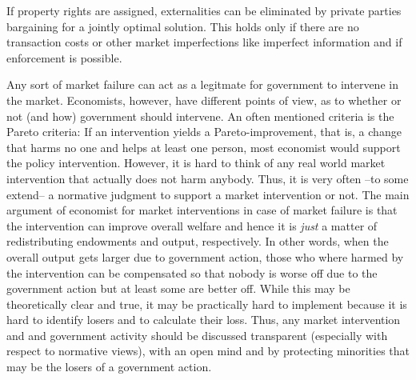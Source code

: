 {{		\item If property rights are assigned, externalities can be eliminated by private parties bargaining for a jointly optimal solution. This holds only if there are no transaction costs or other market imperfections like imperfect information and if enforcement is possible.
		
		\item Any sort of market failure can act as a legitmate for government to intervene in the market. Economists, however, have different points of view, as to whether or not (and how) government should intervene. An often mentioned criteria is the Pareto criteria: If an intervention yields a Pareto-improvement, that is, a change that harms no one and helps at least one person, most economist would support the policy intervention. However, it is hard to think of any real world market intervention that actually does not harm anybody. Thus, it is very often --to some extend-- a normative judgment to support a market intervention or not. The main argument of economist for market interventions in case of market failure is that the intervention can improve overall welfare and hence it is \textit{just} a matter of redistributing endowments and output, respectively. In other words, when the overall output gets larger due to government action, those who where harmed by the intervention can be compensated so that nobody is worse off due to the government action but at least some are better off. While this may be theoretically clear and true, it may be practically hard to implement because it is hard to identify losers and to calculate their loss. Thus, any market intervention and and government activity should be discussed transparent (especially with respect to normative views), with an open mind and by protecting minorities that may be the losers of a government action.
	}
}

\pbn
{}

